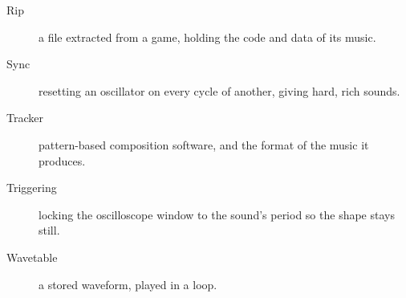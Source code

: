 \begin{description}
  \item[Rip] a file extracted from a game, holding the code and data of its music.
  \item[Sync] resetting an oscillator on every cycle of another, giving hard, rich sounds.
  \item[Tracker] pattern-based composition software, and the format of the music it produces.
  \item[Triggering] locking the oscilloscope window to the sound's period so the shape stays still.
  \item[Wavetable] a stored waveform, played in a loop.
\end{description}
